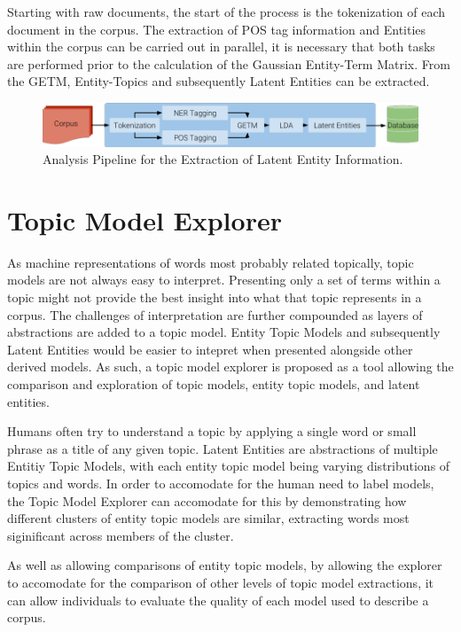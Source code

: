 \documentclass[10pt]{report}
\begin{document}
Starting with raw documents, the start of the process is the tokenization of each document in the corpus. The extraction of POS tag information and Entities within the corpus can be carried out in parallel, it is necessary that both tasks are performed prior to the calculation of the Gaussian Entity-Term Matrix. From the GETM, Entity-Topics and subsequently Latent Entities can be extracted.

\begin{figure}[h!]

  \centering
  \includegraphics[scale=0.445]{pipeline_diagram_bold}
  \caption{Analysis Pipeline for the Extraction of Latent Entity Information.\label{fig:pipeline_diagram}}
\end{figure}

\section{Topic Model Explorer}

As machine representations of words most probably related topically, topic models are not always easy to interpret. Presenting only a set of terms within a topic might not provide the best insight into what that topic represents in a corpus. The challenges of interpretation are further compounded as layers of abstractions are added to a topic model. Entity Topic Models and subsequently Latent Entities would be easier to intepret when presented alongside other derived models. As such, a topic model explorer is proposed as a tool allowing the comparison and exploration of topic models, entity topic models, and latent entities.

Humans often try to understand a topic by applying a single word or small phrase as a title of any given topic. Latent Entities are abstractions of multiple Entitiy Topic Models, with each entity topic model being varying distributions of topics and words. In order to accomodate for the human need to label models, the Topic Model Explorer can accomodate for this by demonstrating how different clusters of entity topic models are similar, extracting words most siginificant across members of the cluster.

As well as allowing comparisons of entity topic models, by allowing the explorer to accomodate for the comparison of other levels of topic model extractions, it can allow individuals to evaluate the quality of each model used to describe a corpus.
\end{document}

